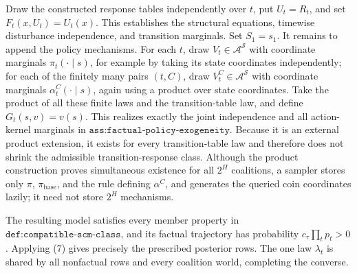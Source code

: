 Draw the constructed response tables independently over \(t\), put \(U_t=R_t\), and set \(F_t(x,U_t)=U_t(x)\).  This establishes the structural equations, timewise disturbance independence, and transition marginals.  Set \(S_1=s_1\).  It remains to append the policy mechanisms.  For each \(t\), draw \(V_t\in\mathcal A^{\mathcal S}\) with coordinate marginals \(\pi_t(\cdot\mid s)\), for example by taking its state coordinates independently; for each of the finitely many pairs \((t,C)\), draw \(V_t^C\in\mathcal A^{\mathcal S}\) with coordinate marginals \(\alpha_t^C(\cdot\mid s)\), again using a product over state coordinates.  Take the product of all these finite laws and the transition-table law, and define \(G_t(s,v)=v(s)\).  This realizes exactly the joint independence and all action-kernel marginals in \(\texttt{ass:factual-policy-exogeneity}\).  Because it is an external product extension, it exists for every transition-table law and therefore does not shrink the admissible transition-response class.  Although the product construction proves simultaneous existence for all \(2^H\) coalitions, a sampler stores only \(\pi\), \(\pi_{\mathrm{base}}\), and the rule defining \(\alpha^C\), and generates the queried coin coordinates lazily; it need not store \(2^H\) mechanisms.

The resulting model satisfies every member property in \(\texttt{def:compatible-scm-class}\), and its factual trajectory has probability \(c_\tau\prod_t p_t>0\).  Applying (7) gives precisely the prescribed posterior rows.  The one law \(\lambda_t\) is shared by all nonfactual rows and every coalition world, completing the converse.